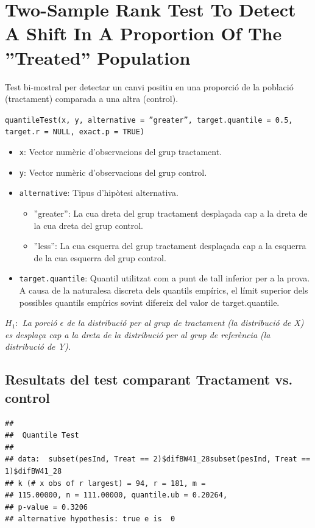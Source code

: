 \documentclass[11pt,a4paper]{article}\usepackage[]{graphicx}\usepackage[]{color}
\makeatletter
\newenvironment{kframe}{%
 \def\at@end@of@kframe{}%
 \ifinner\ifhmode%
  \def\at@end@of@kframe{\end{minipage}}%
  \begin{minipage}{\columnwidth}%
 \fi\fi%
 \def\FrameCommand##1{\hskip\@totalleftmargin \hskip-\fboxsep
 \colorbox{shadecolor}{##1}\hskip-\fboxsep
     \hskip-\linewidth \hskip-\@totalleftmargin \hskip\columnwidth}%
 \MakeFramed {\advance\hsize-\width
   \@totalleftmargin\z@ \linewidth\hsize
   \@setminipage}}%
 {\par\unskip\endMakeFramed%
 \at@end@of@kframe}
\newenvironment{knitrout}{}{} %
\makeatother
\begin{document}
\clearpage
\section{Two-Sample Rank Test To Detect A Shift In A Proportion Of The ''Treated'' Population}



Test bi-mostral per detectar un canvi positiu en una proporció de la població (tractament) comparada a una altra (control).

\texttt{quantileTest(x, y, alternative = ''greater'', target.quantile = 0.5, target.r = NULL, exact.p = TRUE)}
    
\begin{itemize}
  \item \texttt{x}: Vector numèric d'observacions del grup tractament.
  
  \item \texttt{y}: Vector numèric d'observacions del grup control.
  
  \item \texttt{alternative}: Tipus d'hipòtesi alternativa.

\begin{itemize}
      \item ''greater'': La cua dreta del grup tractament desplaçada cap a la dreta de la cua dreta del grup control.
      
      \item ''less'': La cua esquerra del grup tractament desplaçada cap a la esquerra de la cua esquerra del grup control.
\end{itemize}


  \item \texttt{target.quantile}: Quantil utilitzat com a punt de tall inferior per a la prova. A causa de la naturalesa discreta dels quantils empírics, el límit superior dels possibles quantils empírics sovint difereix del valor de target.quantile.

\end{itemize}

\textit{$H_1:$ La porció $\epsilon$ de la distribució per al grup de tractament (la distribució de X) es desplaça cap a la dreta de la distribució per al grup de referència (la distribució de Y).}



\subsection{Resultats del test comparant Tractament vs. control}
\begin{knitrout}
\color{fgcolor}\begin{kframe}
\begin{verbatim}
## 
## 	Quantile Test
## 
## data:  subset(pesInd, Treat == 2)$difBW41_28subset(pesInd, Treat == 1)$difBW41_28
## k (# x obs of r largest) = 94, r = 181, m =
## 115.00000, n = 111.00000, quantile.ub = 0.20264,
## p-value = 0.3206
## alternative hypothesis: true e is  0
\end{verbatim}
\end{kframe}
\end{knitrout}
\end{document}
